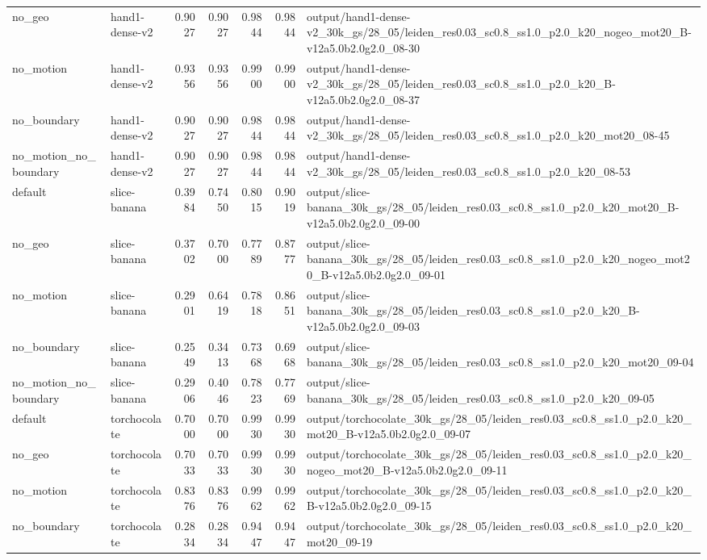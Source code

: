 \documentclass[10pt]{article}
\begin{document}
\begin{longtable}{llrrrrp{9cm}}
no\_geo & hand1-dense-v2 & 0.9027 & 0.9027 & 0.9844 & 0.9844 & output/hand1-dense-v2\_30k\_gs/28\_05/leiden\_res0.03\_sc0.8\_ss1.0\_p2.0\_k20\_nogeo\_mot20\_B-v12a5.0b2.0g2.0\_08-30 \\
no\_motion & hand1-dense-v2 & 0.9356 & 0.9356 & 0.9900 & 0.9900 & output/hand1-dense-v2\_30k\_gs/28\_05/leiden\_res0.03\_sc0.8\_ss1.0\_p2.0\_k20\_B-v12a5.0b2.0g2.0\_08-37 \\
no\_boundary & hand1-dense-v2 & 0.9027 & 0.9027 & 0.9844 & 0.9844 & output/hand1-dense-v2\_30k\_gs/28\_05/leiden\_res0.03\_sc0.8\_ss1.0\_p2.0\_k20\_mot20\_08-45 \\
no\_motion\_no\_boundary & hand1-dense-v2 & 0.9027 & 0.9027 & 0.9844 & 0.9844 & output/hand1-dense-v2\_30k\_gs/28\_05/leiden\_res0.03\_sc0.8\_ss1.0\_p2.0\_k20\_08-53 \\
default & slice-banana & 0.3984 & 0.7450 & 0.8015 & 0.9019 & output/slice-banana\_30k\_gs/28\_05/leiden\_res0.03\_sc0.8\_ss1.0\_p2.0\_k20\_mot20\_B-v12a5.0b2.0g2.0\_09-00 \\
no\_geo & slice-banana & 0.3702 & 0.7000 & 0.7789 & 0.8777 & output/slice-banana\_30k\_gs/28\_05/leiden\_res0.03\_sc0.8\_ss1.0\_p2.0\_k20\_nogeo\_mot20\_B-v12a5.0b2.0g2.0\_09-01 \\
no\_motion & slice-banana & 0.2901 & 0.6419 & 0.7818 & 0.8651 & output/slice-banana\_30k\_gs/28\_05/leiden\_res0.03\_sc0.8\_ss1.0\_p2.0\_k20\_B-v12a5.0b2.0g2.0\_09-03 \\
no\_boundary & slice-banana & 0.2549 & 0.3413 & 0.7368 & 0.6968 & output/slice-banana\_30k\_gs/28\_05/leiden\_res0.03\_sc0.8\_ss1.0\_p2.0\_k20\_mot20\_09-04 \\
no\_motion\_no\_boundary & slice-banana & 0.2906 & 0.4046 & 0.7823 & 0.7769 & output/slice-banana\_30k\_gs/28\_05/leiden\_res0.03\_sc0.8\_ss1.0\_p2.0\_k20\_09-05 \\
default & torchocolate & 0.7000 & 0.7000 & 0.9930 & 0.9930 & output/torchocolate\_30k\_gs/28\_05/leiden\_res0.03\_sc0.8\_ss1.0\_p2.0\_k20\_mot20\_B-v12a5.0b2.0g2.0\_09-07 \\
no\_geo & torchocolate & 0.7033 & 0.7033 & 0.9930 & 0.9930 & output/torchocolate\_30k\_gs/28\_05/leiden\_res0.03\_sc0.8\_ss1.0\_p2.0\_k20\_nogeo\_mot20\_B-v12a5.0b2.0g2.0\_09-11 \\
no\_motion & torchocolate & 0.8376 & 0.8376 & 0.9962 & 0.9962 & output/torchocolate\_30k\_gs/28\_05/leiden\_res0.03\_sc0.8\_ss1.0\_p2.0\_k20\_B-v12a5.0b2.0g2.0\_09-15 \\
no\_boundary & torchocolate & 0.2834 & 0.2834 & 0.9447 & 0.9447 & output/torchocolate\_30k\_gs/28\_05/leiden\_res0.03\_sc0.8\_ss1.0\_p2.0\_k20\_mot20\_09-19 \\

\end{longtable}
\end{document}
